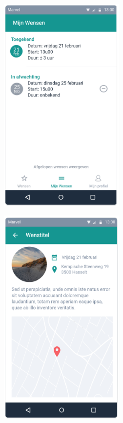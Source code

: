 \begin{figure}[!h]
  \centering
  \begin{subfigure}[h]{0.3\textwidth}
    \centering
    \includegraphics[width=0.685\textwidth]{images/care-athon/wensen.png}
  \end{subfigure}
  \begin{subfigure}[h]{0.3\textwidth}
    \centering
    \includegraphics[width=0.685\textwidth]{images/care-athon/wens.png}

\end{subfigure}
\end{figure}
